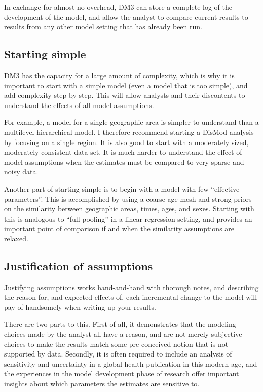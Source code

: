 In exchange for almost no overhead, DM3 can store a complete log of
the development of the model, and allow the analyst to compare current
results to results from any other model setting that has already been
run.


\subsection{Starting simple}
DM3 has the capacity for a large amount of complexity, which is why it
is important to start with a simple model (even a model that is too
simple), and add complexity step-by-step.  This will allow analysts
and their discontents to understand the effects of all model
assumptions.

For example, a model for a single geographic area is simpler to
understand than a multilevel hierarchical model.  I therefore
recommend starting a DisMod analysis by focusing on a single region.
It is also good to start with a moderately sized, moderately
consistent data set.  It is much harder to understand the effect of
model assumptions when the estimates must be compared to very sparse
and noisy data.

Another part of starting simple is to begin with a model with few
``effective parameters''.  This is accomplished by using a coarse age
mesh and strong priors on the similarity between geographic areas,
times, ages, and sexes.  Starting with this is analogous to ``full
pooling'' in a linear regression setting, and provides an important
point of comparison if and when the similarity assumptions are
relaxed.


\subsection{Justification of assumptions}
Justifying assumptions works hand-and-hand with thorough notes, and
describing the reason for, and expected effects of, each incremental
change to the model will pay of handsomely when writing up your
results.

There are two parts to this.  First of all, it demonstrates that the
modeling choices made by the analyst all have a reason, and are not
merely subjective choices to make the results match some pre-conceived
notion that is not supported by data.  Secondly, it is often required
to include an analysis of sensitivity and uncertainty in a global
health publication in this modern age, and the experiences in the
model development phase of research offer important insights about
which parameters the estimates are sensitive to.

